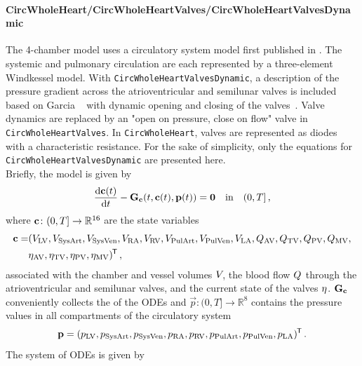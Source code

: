 \paragraph{CircWholeHeart/CircWholeHeartValves/CircWholeHeartValvesDynamic} The 4-chamber model uses a circulatory system model first published in \cite{Gerach-2021}.
The systemic and pulmonary circulation are each represented by a three-element Windkessel model. 
With \verb|CircWholeHeartValvesDynamic|, a description of the pressure gradient across the atrioventricular and semilunar valves is included based on Garcia \etal~\cite{Garcia2005} with dynamic opening and closing of the valves~\cite{Mynard2012}.
Valve dynamics are replaced by an "open on pressure, close on flow" valve in \verb|CircWholeHeartValves|.
In \verb|CircWholeHeart|, valves are represented as diodes with a characteristic resistance.
For the sake of simplicity, only the equations for \verb|CircWholeHeartValvesDynamic| are presented here.
\newline \\
Briefly, the model is given by
\begin{equation}
\dv{\c(t)}{t} - \Gc(t, \c(t),\vec p(t)) = \vec 0 \qin (0,T] \,, \label{eq:C}
\end{equation}
where $\c\colon(0,T]\rightarrow\mathbb{R}^{16}$ are the state variables
\begin{align*}
    \c = 
    &(\vol{LV}, \vol{SysArt}, \vol{SysVen}, \vol{RA}, \vol{RV}, \vol{PulArt}, \vol{PulVen}, \vol{LA}, \Q{AV}, \Q{TV}, \Q{PV}, \Q{MV}, \\
    & \state{AV}, \state{TV}, \state{PV}, \state{MV})^\tran \,,
\end{align*}
 associated with the chamber and vessel volumes $V_\mathrm{}$, the blood flow $Q_\mathrm{}$ through the atrioventricular and semilunar valves, and the current state of the valves $\eta_\mathrm{}$.
$\Gc$ conveniently collects the \rhs of the ODEs and $\vec p\colon(0,T]\rightarrow\mathbb{R}^{8}$ contains the pressure values in all compartments of the circulatory system
\begin{equation*}
    \vec p = (\p{LV}, \p{SysArt}, \p{SysVen}, \p{RA}, \p{RV}, \p{PulArt}, \p{PulVen}, \p{LA})^\tran \,.
\end{equation*}
The system of ODEs is given by 
